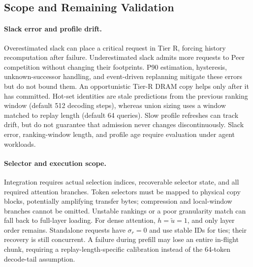 \subsection{Scope and Remaining Validation}
\label{sec:design-discussion}

\paragraph{Slack error and profile drift.}
Overestimated slack can place a critical request in Tier R, forcing
history recomputation after failure. Underestimated slack admits more
requests to Peer competition without changing their footprints.
P90 estimation, hysteresis, unknown-successor handling, and event-driven
replanning mitigate these errors but do not bound them. An opportunistic
Tier-R DRAM copy helps only after it has committed.
Hot-set identities are stale predictions from the previous ranking
window (default 512 decoding steps), whereas union sizing uses a window
matched to replay length (default 64 queries). Slow profile refreshes
can track drift, but do not guarantee that admission never changes
discontinuously. Slack error, ranking-window length, and profile age
require evaluation under agent workloads.

\paragraph{Selector and execution scope.}
Integration requires actual selection indices, recoverable selector
state, and all required attention branches. Token selectors must be
mapped to physical copy blocks, potentially amplifying transfer bytes;
compression and local-window branches cannot be omitted.
Unstable rankings or a poor granularity match can fall back to full-layer
loading. For dense attention, $h=\widetilde u=1$, and only layer order
remains. Standalone requests have $\sigma_r=0$ and use stable IDs for ties;
their recovery is still concurrent. A failure during prefill may lose
an entire in-flight chunk, requiring a replay-length-specific calibration
instead of the 64-token decode-tail assumption.

